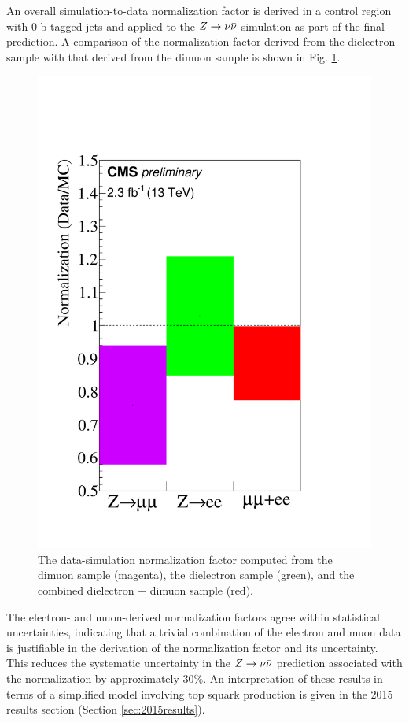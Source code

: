 An overall simulation-to-data normalization factor is derived in a control region with 0 b-tagged jets and applied to the $Z\rightarrow \nu\bar{\nu}$ simulation as part of the final prediction. A comparison of the normalization factor derived from the dielectron sample with that derived from the dimuon sample is shown in Fig. \ref{fig:ZInvNorm}.
\begin{figure}[h]
\centering
\includegraphics[width=0.4\linewidth]{figures/SusySearches/HadStop2015/NormFactors.pdf}
\caption{The data-simulation normalization factor computed from the dimuon sample (magenta), the dielectron sample (green), and the combined dielectron $+$ dimuon sample (red). }
\label{fig:ZInvNorm}
\end{figure}
\FloatBarrier
\noindent
The electron- and muon-derived normalization factors agree within statistical uncertainties, indicating that a trivial combination of the electron and muon data is justifiable in the derivation of the normalization factor and its uncertainty. This reduces the systematic uncertainty in the $Z\rightarrow \nu\bar{\nu}$ prediction associated with the normalization by approximately 30\%. An interpretation of these results in terms of a simplified model involving top squark production is given in the 2015 results section (Section \ref{sec:2015results}).
